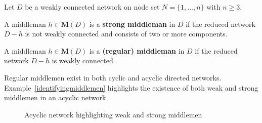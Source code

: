 \begin{definition} \label{strongweakmiddlemen} 
Let $D$ be a weakly connected network on node set $N = \{ 1, \ldots ,n \}$ with $n \geqslant 3$.
\begin{numm}
	\item A middleman $h \in \mathbf M (D)$ is a \textbf{strong middleman} in $D$ if the reduced network $D - h$ is not weakly connected and consists of two or more components.

\item A middleman $h \in \mathbf M (D)$ is a \textbf{(regular) middleman} in $D$ if the reduced network $D - h$ is weakly connected.
\end{numm}
\end{definition}

\noindent
Regular middlemen exist in both cyclic and acyclic directed networks. Example~\ref{identifyingmiddlemen} highlights the existence of both weak and strong middlemen in an acyclic network.

\begin{figure}[h]
\begin{center}
\end{center}
\caption{Acyclic network highlighting weak and strong middlemen}
\label{weakmm}
\end{figure}

